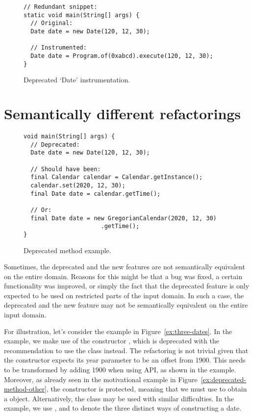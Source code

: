 \documentclass[runningheads,a4paper]{llncs}
\begin{document}
\begin{figure}
\begin{lstlisting}[mathescape=true,showstringspaces=false]
// Redundant snippet:
static void main(String[] args) {
  // Original:
  Date date = new Date(120, 12, 30);

  // Instrumented:
  Date date = Program.of(0xabcd).execute(120, 12, 30);
}
\end{lstlisting}
\caption{Deprecated `Date' instrumentation.}
\label{ex:date-instrumentation}
\end{figure}

\section{Semantically different refactorings}


\begin{figure}
\begin{lstlisting}[mathescape=true,showstringspaces=false]
void main(String[] args) {
  // Deprecated:
  Date date = new Date(120, 12, 30);
 
  // Should have been:
  final Calendar calendar = Calendar.getInstance();
  calendar.set(2020, 12, 30);
  final Date date = calendar.getTime();

  // Or:
  final Date date = new GregorianCalendar(2020, 12, 30)
                      .getTime();
}
\end{lstlisting}
\caption{Deprecated method example.}
\label{ex:deprecated-method}
\end{figure}


Sometimes, the deprecated and the new features are not semantically
equivalent on the entire domain. Reasons for this might be that a bug
was fixed, a certain functionality was improved, or simply the fact
that the deprecated feature is only expected to be used on restricted
parts of the input domain. In such a case, the deprecated and the new
feature may not be semantically equivalent on the entire input domain.

For illustration, let's consider the example in Figure~\ref{ex:three-dates}.
In the example, we make use of the constructor , 
which is deprecated with the 
recommendation to use the  class instead.
The refactoring is not trivial given that the 
 constructor expects its year parameter to be an offset
from 1900.  This needs to be
transformed by adding 1900 when using  API, as shown in the
example. Moreover, as already seen in the motivational example in  Figure~\ref{ex:deprecated-method-other},
the  constructor is protected,
meaning that we must use  to obtain a
 object.
Alternatively, the  class may be used with
similar difficulties.
In the example, we use ,  and  to denote the three distinct ways of constructing a date.
\end{document}
